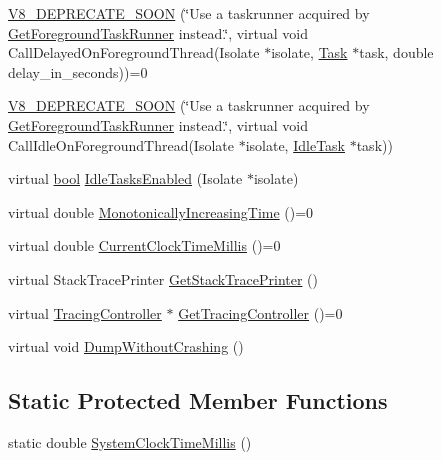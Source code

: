 \begin{DoxyCompactItemize}
\item 
\mbox{\hyperlink{classv8_1_1Platform_a7bdd7f9f31ce5fe5c5f0fd8a0e597d04}{V8\+\_\+\+D\+E\+P\+R\+E\+C\+A\+T\+E\+\_\+\+S\+O\+ON}} (\char`\"{}Use a taskrunner acquired by \mbox{\hyperlink{classv8_1_1Platform_af0d18c6bbefa133c5d11ec8a460d0278}{Get\+Foreground\+Task\+Runner}} instead.\char`\"{}, virtual void Call\+Delayed\+On\+Foreground\+Thread(Isolate $\ast$isolate, \mbox{\hyperlink{classv8_1_1Task}{Task}} $\ast$task, double delay\+\_\+in\+\_\+seconds))=0
\item 
\mbox{\hyperlink{classv8_1_1Platform_a2164bf101f39010ec95e117a69a4e782}{V8\+\_\+\+D\+E\+P\+R\+E\+C\+A\+T\+E\+\_\+\+S\+O\+ON}} (\char`\"{}Use a taskrunner acquired by \mbox{\hyperlink{classv8_1_1Platform_af0d18c6bbefa133c5d11ec8a460d0278}{Get\+Foreground\+Task\+Runner}} instead.\char`\"{}, virtual void Call\+Idle\+On\+Foreground\+Thread(Isolate $\ast$isolate, \mbox{\hyperlink{classv8_1_1IdleTask}{Idle\+Task}} $\ast$task))
\item 
virtual \mbox{\hyperlink{classbool}{bool}} \mbox{\hyperlink{classv8_1_1Platform_ad229642bf16a066d2e8d866dc128141e}{Idle\+Tasks\+Enabled}} (Isolate $\ast$isolate)
\item 
virtual double \mbox{\hyperlink{classv8_1_1Platform_a6d4d7c2dcf6b0c7113099b97fa7f57b7}{Monotonically\+Increasing\+Time}} ()=0
\item 
virtual double \mbox{\hyperlink{classv8_1_1Platform_a8aa46c7f8e492351ebe1bc8168ec9c2f}{Current\+Clock\+Time\+Millis}} ()=0
\item 
virtual Stack\+Trace\+Printer \mbox{\hyperlink{classv8_1_1Platform_aadb2594e6ff9a6f6a0657412ff5a7206}{Get\+Stack\+Trace\+Printer}} ()
\item 
virtual \mbox{\hyperlink{classv8_1_1TracingController}{Tracing\+Controller}} $\ast$ \mbox{\hyperlink{classv8_1_1Platform_aa760c7bf8c46495eb650d2be72399747}{Get\+Tracing\+Controller}} ()=0
\item 
virtual void \mbox{\hyperlink{classv8_1_1Platform_abcbf846fdfc791569f64de675d522cac}{Dump\+Without\+Crashing}} ()
\end{DoxyCompactItemize}
\subsection*{Static Protected Member Functions}
\begin{DoxyCompactItemize}
\item 
static double \mbox{\hyperlink{classv8_1_1Platform_accf17a5dcca8d35e130a0d2e9d4fa0fc}{System\+Clock\+Time\+Millis}} ()
\end{DoxyCompactItemize}


